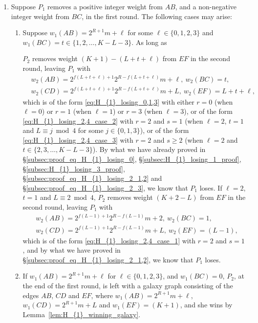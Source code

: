 \documentclass[11pt,reqno]{amsart}
\theoremstyle{definition}
\theoremstyle{definition}
\begin{document}
\begin{enumerate}
\item Suppose $P_{1}$ removes a positive integer weight from $AB$, and a non-negative integer weight from $BC$, in the first round. The following cases may arise:
\begin{enumerate}
\item Suppose $w_{1}(AB)=2^{R+1}m+\ell$ for some $\ell \in \{0,1,2,3\}$ and $w_{1}(BC)=t\in\{1,2,\ldots,K-L-3\}$. As long as 
$P_{2}$ removes weight $(K+1)-(L+t+\ell)$ from $EF$ in the second round, leaving $P_{1}$ with
\begin{align}
{}&w_{2}(AB)=2^{f(L+t+\ell)+1}2^{R-f(L+t+\ell)}m+\ell,\ w_{2}(BC)=t,\nonumber\\
{}&w_{2}(CD)=2^{f(L+t+\ell)+1}2^{R-f(L+t+\ell)}m+L,\ w_{2}(EF)=L+t+\ell,\nonumber
\end{align}
which is of the form \eqref{eq:H_{1}_losing_0,1,3} with either $r=0$ (when $\ell=0$) or $r=1$ (when $\ell=1$) or $r=3$ (when $\ell=3$), or of the form \eqref{eq:H_{1}_losing_2,4_case_2} with $r=2$ and $s=1$ (when $\ell=2$, $t=1$ and $L \equiv j \bmod 4$ for some $j \in \{0,1,3\}$), or of the form \eqref{eq:H_{1}_losing_2,4_case_3} with $r=2$ and $s\geqslant 2$ (when $\ell=2$ and $t\in\{2,3,\ldots,K-L-3\}$). By what we have already proved in \S\ref{subsec:proof_eq_H_{1}_losing_0}, \S\ref{subsec:H_{1}_losing_1_proof}, \S\ref{subsec:H_{1}_losing_3_proof}, \S\ref{subsec:proof_eq_H_{1}_losing_2_1,2} and \S\ref{subsec:proof_eq_H_{1}_losing_2_3}, we know that $P_{1}$ loses. If $\ell=2$, $t=1$ and $L\equiv 2 \bmod 4$, $P_{2}$ removes weight $(K+2-L)$ from $EF$ in the second round, leaving $P_{1}$ with
\begin{align}
{}&w_{2}(AB)=2^{f(L-1)+1}2^{R-f(L-1)}m+2,\ w_{2}(BC)=1,\nonumber\\
{}&w_{2}(CD)=2^{f(L-1)+1}2^{R-f(L-1)}m+L,\ w_{2}(EF)=(L-1),\nonumber
\end{align}
which is of the form \eqref{eq:H_{1}_losing_2,4_case_1} with $r=2$ and $s=1$, and by what we have proved in \S\ref{subsec:proof_eq_H_{1}_losing_2_1,2}, we know that $P_{1}$ loses.

\item If $w_{1}(AB)=2^{R+1}m+\ell$ for $\ell \in \{0,1,2,3\}$, and $w_{1}(BC)=0$, $P_{2}$, at the end of the first round, is left with a galaxy graph consisting of the edges $AB$, $CD$ and $EF$, where $w_{1}(AB)=2^{R+1}m+\ell$, $w_{1}(CD)=2^{R+1}m+L$ and $w_{1}(EF)=(K+1)$, and she wins by Lemma~\ref{lem:H_{1}_winning_galaxy}.


\end{enumerate}
\end{enumerate}
\end{document}
